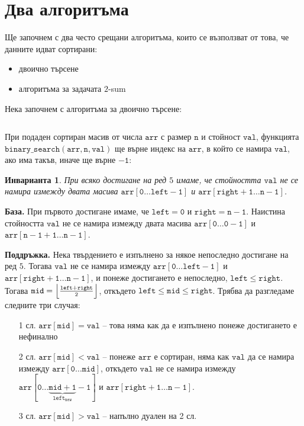 \documentclass{article}
\theoremstyle{definition}
\theoremstyle{plain}
\newtheorem*{invariant}{Инварианта}
\theoremstyle{remark}
\theoremstyle{definition}
\begin{document}
\section*{Два алгоритъма}

Ще започнем с два често срещани алгоритъма, които се възползват от това, че данните идват сортирани:
\begin{itemize}
    \item двоично търсене
    \item алгоритъма за задачата $2$-sum
\end{itemize}

Нека започнем с алгоритъма за двоично търсене:
\inputminted[linenos]{c++}{algorithms/binary_search.cpp}

При подаден сортиран масив от числа $\mathtt{arr}$ с размер $\mathtt{n}$ и стойност $\mathtt{val}$, функцията $\mathtt{binary\_search(arr, n, val)}$ ще върне индекс на $\mathtt{arr}$, в който се намира $\mathtt{val}$, ако има такъв, иначе ще върне $\mathtt{-1}$:
\begin{invariant}
    При всяко достигане на ред $5$ имаме, че стойността $\mathtt{val}$ не се намира измежду двата масива $\mathtt{arr[0 \dots left - 1]}$ и $\mathtt{arr[right + 1 \dots n - 1]}$.
\end{invariant}

\textbf{База.}
При първото достигане имаме, че $\mathtt{left = 0}$ и $\mathtt{right = n - 1}$.
Наистина стойността $\mathtt{val}$ не се намира измежду двата масива $\mathtt{arr[0 \dots 0 -1]}$ и $\mathtt{arr[n - 1 + 1 \dots n - 1]}$.

\textbf{Поддръжка.}
Нека твърдението е изпълнено за някое непоследно достигане на ред $5$.
Тогава $\mathtt{val}$ не се намира измежду $\mathtt{arr[0 \dots left - 1]}$ и $\mathtt{arr[right + 1 \dots n - 1]}$, и понеже достигането е непоследно, $\mathtt{left \leq right}$.
Тогава $\mathtt{mid = \Bigl\lfloor \frac{left + right}{2} \Bigr\rfloor}$, откъдето $\mathtt{left \leq mid \leq right}$.
Трябва да разгледаме следните три случая:
\begin{itemize}
    \item[1 сл.] $\mathtt{arr[mid] = val}$ -- това няма как да е изпълнено понеже достигането е нефинално
    \item[2 сл.] $\mathtt{arr[mid] < val}$ -- понеже $\mathtt{arr}$ е сортиран, няма как $\mathtt{val}$ да се намира измежду $\mathtt{arr[0 \dots mid]}$, откъдето $\mathtt{val}$ не се намира измежду $\mathtt{arr[0 \dots \underbrace{\mathtt{mid + 1}}_{left_{new}} - 1]}$ и $\mathtt{arr[right + 1 \dots n - 1]}$.
    \item[3 сл.] $\mathtt{arr[mid] > val}$ -- напълно дуален на 2 сл.
\end{itemize}
\end{document}
